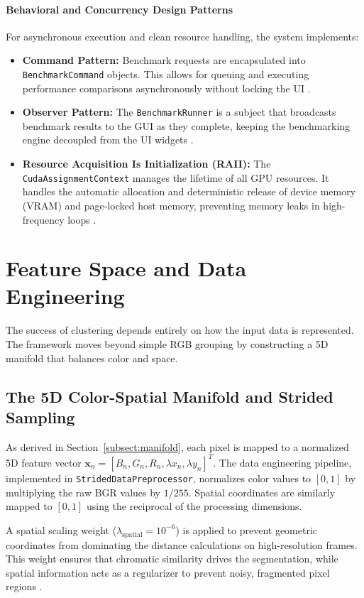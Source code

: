 \paragraph{Behavioral and Concurrency Design Patterns}
For asynchronous execution and clean resource handling, the system implements:
\begin{itemize}
    \item \textbf{Command Pattern:} Benchmark requests are encapsulated into \texttt{Benchmark\allowbreak Command} objects. This allows for queuing and executing performance comparisons asynchronously without locking the UI \cite{gamma1995design}.
    \item \textbf{Observer Pattern:} The \texttt{BenchmarkRunner} is a subject that broadcasts benchmark results to the GUI as they complete, keeping the benchmarking engine decoupled from the UI widgets \cite{gamma1995design}.
    \item \textbf{Resource Acquisition Is Initialization (RAII):} The \texttt{CudaAssignment\allowbreak Context} manages the lifetime of all GPU resources. It handles the automatic allocation and deterministic release of device memory (VRAM) and page-locked host memory, preventing memory leaks in high-frequency loops \cite{stroustrup2022tour}.
\end{itemize}

\section{Feature Space and Data Engineering}
The success of clustering depends entirely on how the input data is represented. The framework moves beyond simple RGB grouping by constructing a 5D manifold that balances color and space.

\subsection{The 5D Color-Spatial Manifold and Strided Sampling}\label{subsect:normalized_manifold}
As derived in Section~\ref{subsect:manifold}, each pixel is mapped to a normalized 5D feature vector $\mathbf{x}_n = [B_n, G_n, R_n, \lambda x_n, \lambda y_n]^T$. The data engineering pipeline, implemented in \texttt{StridedDataPreprocessor}, normalizes color values to $[0, 1]$ by multiplying the raw BGR values by $1/255$. Spatial coordinates are similarly mapped to $[0, 1]$ using the reciprocal of the processing dimensions. 

A spatial scaling weight ($\lambda_{\text{spatial}} = 10^{-6}$) is applied to prevent geometric coordinates from dominating the distance calculations on high-resolution frames. This weight ensures that chromatic similarity drives the segmentation, while spatial information acts as a regularizer to prevent noisy, fragmented pixel regions \cite{shi2000normalized, achanta2012slic}.

